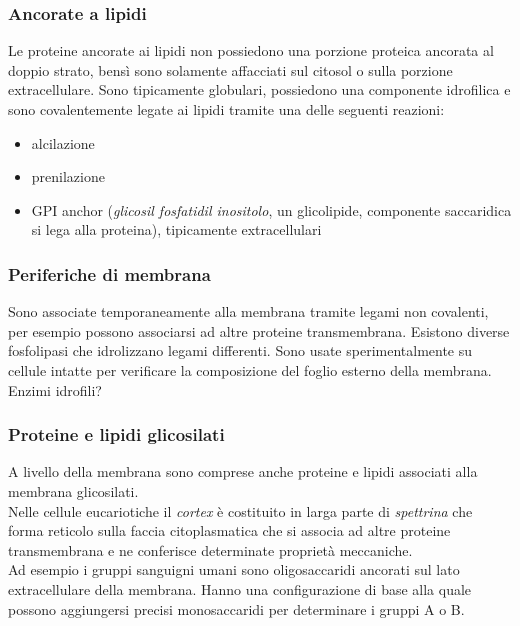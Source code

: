         \subsubsection{Ancorate a lipidi}
            Le proteine ancorate ai lipidi non possiedono una porzione proteica ancorata al doppio strato, bensì sono solamente affacciati sul citosol o sulla porzione extracellulare.
            Sono tipicamente globulari, possiedono una componente idrofilica e sono covalentemente legate ai lipidi tramite una delle seguenti reazioni:
            \begin{itemize}
                \item alcilazione
                \item prenilazione
                \item GPI anchor (\textit{glicosil fosfatidil inositolo}, un glicolipide, componente saccaridica si lega alla proteina), tipicamente extracellulari
            \end{itemize}
            
        \subsubsection{Periferiche di membrana}
            Sono associate temporaneamente alla membrana tramite legami non covalenti, per esempio possono associarsi ad altre proteine transmembrana. Esistono diverse fosfolipasi che idrolizzano legami differenti. Sono usate sperimentalmente su cellule intatte per verificare la composizione del foglio esterno della membrana. Enzimi idrofili?
        
        \subsubsection{Proteine e lipidi glicosilati}
            A livello della membrana sono comprese anche proteine e lipidi associati alla membrana glicosilati. \\
            Nelle cellule eucariotiche il \textit{cortex} è costituito in larga parte di \textit{spettrina} che forma reticolo sulla faccia citoplasmatica che si associa ad altre proteine transmembrana e ne conferisce determinate proprietà meccaniche.\\
            Ad esempio i gruppi sanguigni umani sono oligosaccaridi ancorati sul lato extracellulare della membrana. Hanno una configurazione di base alla quale possono aggiungersi precisi monosaccaridi per determinare i gruppi A o B. 
            
